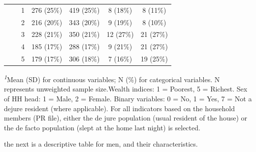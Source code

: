 \documentclass[
]{article}
\begin{document}
\begin{table}[t]
\begin{tabular*}{\linewidth}{@{\extracolsep{\fill}}lcccc}
    1 & 276 (25\%) & 419 (25\%) & 8 (18\%) & 8 (11\%) \\ 
    2 & 216 (20\%) & 343 (20\%) & 9 (19\%) & 8 (10\%) \\ 
    3 & 228 (21\%) & 350 (21\%) & 12 (27\%) & 21 (27\%) \\ 
    4 & 185 (17\%) & 288 (17\%) & 9 (21\%) & 21 (27\%) \\ 
    5 & 179 (17\%) & 306 (18\%) & 7 (16\%) & 19 (25\%) \\ 
\bottomrule
\end{tabular*}
\begin{minipage}{\linewidth}
\textsuperscript{\textit{1}}Mean (SD) for continuous variables; N (\%) for categorical variables. N represents unweighted sample size.Wealth indices: 1 = Poorest, 5 = Richest. Sex of HH head: 1 = Male, 2 = Female. Binary variables: 0 = No, 1 = Yes, 7 = Not a dejure resident (where applicable). For all indicators based on the household members (PR file), either the de jure population (usual resident of the house) or the de facto population (slept at the home last night) is selected.\\
\end{minipage}
\end{table}

the next is a descriptive table for men, and their characteristics.
\end{document}
